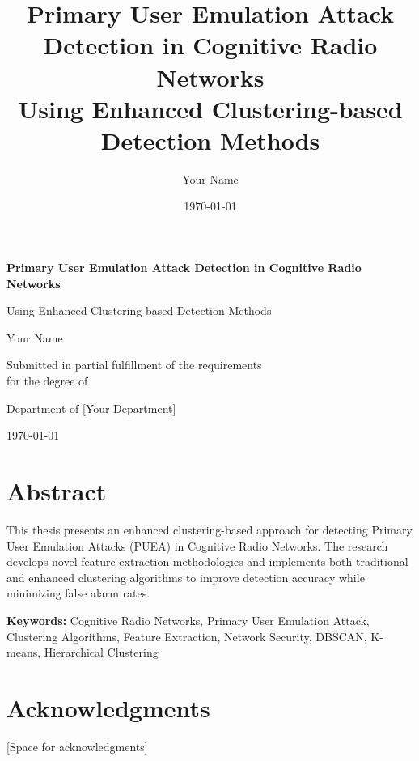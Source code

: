 \documentclass[12pt,a4paper]{report}
\title{Primary User Emulation Attack Detection in Cognitive Radio Networks\\
\large Using Enhanced Clustering-based Detection Methods}
\author{Your Name}
\date{\today}
\begin{document}

\begin{titlepage}
\centering
\vspace*{1cm}
{\huge\bfseries Primary User Emulation Attack Detection in Cognitive Radio Networks\par}
\vspace{0.5cm}
{\Large Using Enhanced Clustering-based Detection Methods\par}
\vspace{2cm}
{\Large Your Name\par}
\vspace{1cm}
{\large Submitted in partial fulfillment of the requirements\\
for the degree of\\
[Your Degree]\par}
\vspace{1cm}
{\large Department of [Your Department]\\
[Your University]\par}
\vspace{1cm}
{\large \today\par}
\vfill
\end{titlepage}

\chapter*{Abstract}
This thesis presents an enhanced clustering-based approach for detecting Primary User Emulation Attacks (PUEA) in Cognitive Radio Networks. The research develops novel feature extraction methodologies and implements both traditional and enhanced clustering algorithms to improve detection accuracy while minimizing false alarm rates.

\textbf{Keywords:} Cognitive Radio Networks, Primary User Emulation Attack, Clustering Algorithms, Feature Extraction, Network Security, DBSCAN, K-means, Hierarchical Clustering

\chapter*{Acknowledgments}
[Space for acknowledgments]

\end{document}
